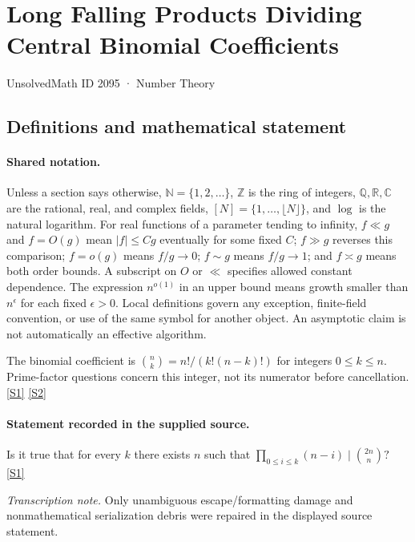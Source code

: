 \documentclass[11pt,a4paper]{article}
\newcommand{\N}{\mathbb{N}}
\newcommand{\Z}{\mathbb{Z}}
\newcommand{\Q}{\mathbb{Q}}
\newcommand{\R}{\mathbb{R}}
\newcommand{\C}{\mathbb{C}}
\newcommand{\sref}[2]{\hyperlink{source:#1:#2}{[S#2]}}
\begin{document}

\setcounter{section}{2094}

\section{Long Falling Products Dividing Central Binomial Coefficients}\label{2095}

{\small\sffamily UnsolvedMath ID 2095 · Number Theory}

\subsection{Definitions and mathematical statement}

\paragraph{Shared notation.}Unless a section says otherwise, $\N=\{1,2,\ldots\}$,
$\Z$ is the ring of integers, $\Q,\R,\C$ are the rational, real, and complex
fields, $[N]=\{1,\ldots,\lfloor N\rfloor\}$, and $\log$ is the natural
logarithm. For real functions of a parameter tending to infinity,
$f\ll g$ and $f=O(g)$ mean $|f|\leq Cg$ eventually for some fixed $C$;
$f\gg g$ reverses this comparison; $f=o(g)$ means $f/g\to0$;
$f\sim g$ means $f/g\to1$; and $f\asymp g$ means both order bounds.
A subscript on $O$ or $\ll$ specifies allowed constant dependence.
The expression $n^{o(1)}$ in an upper bound means growth smaller than
$n^\epsilon$ for each fixed $\epsilon>0$. Local definitions govern any
exception, finite-field convention, or use of the same symbol for another
object. An asymptotic claim is not automatically an effective algorithm.



The binomial coefficient is $\binom nk=n!/(k!(n-k)!)$ for integers $0\leq k\leq n$. Prime-factor questions concern this integer, not its numerator before cancellation. \sref{2095}{1} \sref{2095}{2}

\paragraph{Statement recorded in the supplied source.}
Is it true that for every $k$ there exists $n$ such that $ \prod_{0\leq i\leq k}(n-i) \mid \binom{2n}{n}? $ \sref{2095}{1}

{\small\emph{Transcription note.} Only unambiguous escape/formatting damage and nonmathematical serialization debris were repaired in the displayed source statement.}
\end{document}
